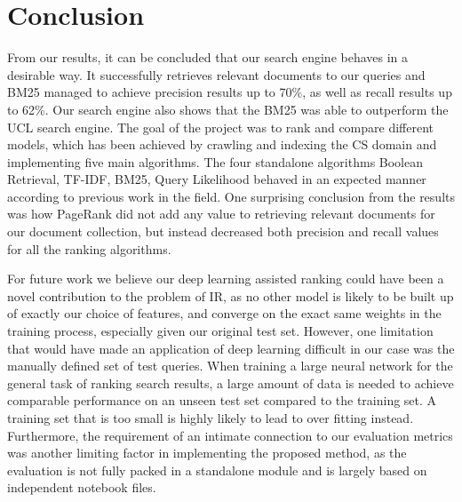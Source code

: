 
\section{Conclusion} %
\label{sec:conclusion}

From our results, it can be concluded that our search engine behaves in a desirable way. It successfully retrieves relevant documents to our queries and BM25 managed to achieve precision results up to 70\%, as well as recall results up to 62\%. Our search engine also shows that the BM25 was able to outperform the UCL search engine. The goal of the project was to rank and compare different models, which has been achieved by crawling and indexing the CS domain and implementing five main algorithms. The four standalone algorithms Boolean Retrieval, TF-IDF, BM25, Query Likelihood behaved in an expected manner according to previous work in the field. One surprising conclusion from the results was how PageRank did not add any value to retrieving relevant documents for our document collection, but instead decreased both precision and recall values for all the ranking algorithms. 

For future work we believe our deep learning assisted ranking could have been a novel contribution to the problem of IR, as no other model is likely to be built up of exactly our choice of features, and converge on the exact same weights in the training process, especially given our original test set. However, one limitation that would have made an application of deep learning difficult in our case was the manually defined set of test queries. When training a large neural network for the general task of ranking search results, a large amount of data is needed to achieve comparable performance on an unseen test set compared to the training set. A training set that is too small is highly likely to lead to over fitting instead. Furthermore, the requirement of an intimate connection to our evaluation metrics was another limiting factor in implementing the proposed method, as the evaluation is not fully packed in a standalone module and is largely based on independent notebook files.



